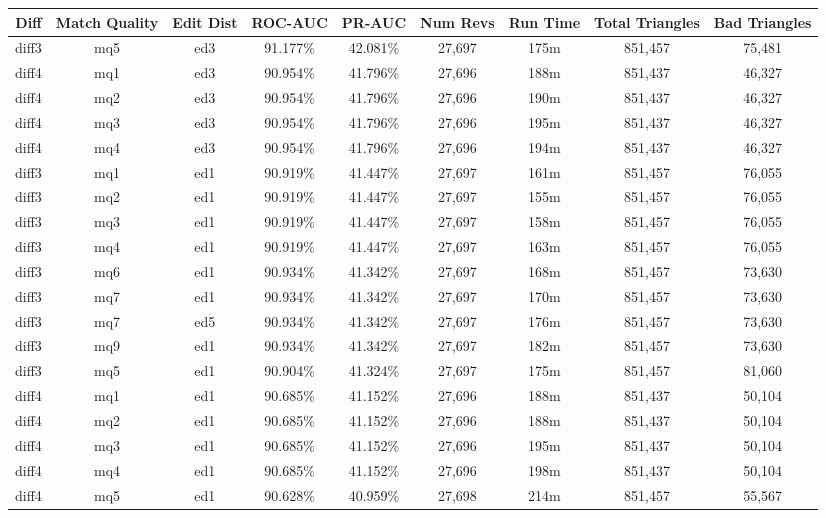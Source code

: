 \begin{sidewaystable}[!tp]
  \begin{center}
    \begin{tabular}{|c|c|c||c|c||c|c|c|c|}
\hline
Diff & Match Quality & Edit Dist
        & ROC-AUC & PR-AUC
        & Num Revs & Run Time
        & Total Triangles & Bad Triangles \\
\hline
\hline
diff3 & mq5 & ed3 & 91.177\% & 42.081\% & 27,697 & 175m & 851,457 & 75,481 \\
diff4 & mq1 & ed3 & 90.954\% & 41.796\% & 27,696 & 188m & 851,437 & 46,327 \\
diff4 & mq2 & ed3 & 90.954\% & 41.796\% & 27,696 & 190m & 851,437 & 46,327 \\
diff4 & mq3 & ed3 & 90.954\% & 41.796\% & 27,696 & 195m & 851,437 & 46,327 \\
diff4 & mq4 & ed3 & 90.954\% & 41.796\% & 27,696 & 194m & 851,437 & 46,327 \\
diff3 & mq1 & ed1 & 90.919\% & 41.447\% & 27,697 & 161m & 851,457 & 76,055 \\
diff3 & mq2 & ed1 & 90.919\% & 41.447\% & 27,697 & 155m & 851,457 & 76,055 \\
diff3 & mq3 & ed1 & 90.919\% & 41.447\% & 27,697 & 158m & 851,457 & 76,055 \\
diff3 & mq4 & ed1 & 90.919\% & 41.447\% & 27,697 & 163m & 851,457 & 76,055 \\
diff3 & mq6 & ed1 & 90.934\% & 41.342\% & 27,697 & 168m & 851,457 & 73,630 \\
diff3 & mq7 & ed1 & 90.934\% & 41.342\% & 27,697 & 170m & 851,457 & 73,630 \\
diff3 & mq7 & ed5 & 90.934\% & 41.342\% & 27,697 & 176m & 851,457 & 73,630 \\
diff3 & mq9 & ed1 & 90.934\% & 41.342\% & 27,697 & 182m & 851,457 & 73,630 \\
diff3 & mq5 & ed1 & 90.904\% & 41.324\% & 27,697 & 175m & 851,457 & 81,060 \\
diff4 & mq1 & ed1 & 90.685\% & 41.152\% & 27,696 & 188m & 851,437 & 50,104 \\
diff4 & mq2 & ed1 & 90.685\% & 41.152\% & 27,696 & 188m & 851,437 & 50,104 \\
diff4 & mq3 & ed1 & 90.685\% & 41.152\% & 27,696 & 195m & 851,437 & 50,104 \\
diff4 & mq4 & ed1 & 90.685\% & 41.152\% & 27,696 & 198m & 851,437 & 50,104 \\
diff4 & mq5 & ed1 & 90.628\% & 40.959\% & 27,698 & 214m & 851,457 & 55,567 \\

\end{tabular}
\end{center}
\end{sidewaystable}
